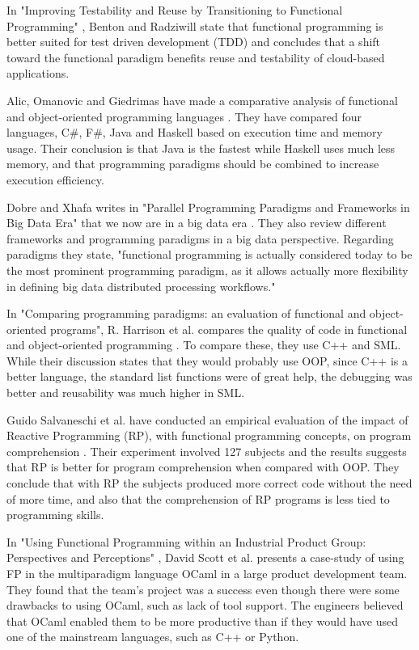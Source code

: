 \documentclass {article}
\begin{document}
In "Improving Testability and Reuse by Transitioning to Functional Programming" \cite{benrad}, Benton and Radziwill state that functional programming is better suited for test driven development (TDD) and concludes that a shift toward the functional paradigm benefits reuse and testability of cloud-based applications.

Alic, Omanovic and Giedrimas have made a comparative analysis of functional and object-oriented programming languages \cite{alomgi}. They have compared four languages, C\#, F\#, Java and Haskell based on execution time and memory usage. Their conclusion is that Java is the fastest while Haskell uses much less memory, and that programming paradigms should be combined to increase execution efficiency. 

Dobre and Xhafa writes in "Parallel Programming Paradigms and Frameworks in Big Data Era" that we now are in a big data era \cite{dobre}. They also review different frameworks and programming paradigms in a big data perspective. Regarding paradigms they state, "functional programming is actually considered today to be the most prominent programming paradigm, as it allows actually more flexibility in defining big data distributed processing workflows."

In "Comparing programming paradigms: an evaluation of functional and object-oriented programs", R. Harrison et al. compares the quality of code in functional and object-oriented programming \cite{hasmadole}. To compare these, they use C++ and SML. While their discussion states that they would probably use OOP, since C++ is a better language, the standard list functions were of great help, the debugging was better and reusability was much higher in SML.

Guido Salvaneschi et al. have conducted an empirical evaluation of the impact of Reactive Programming (RP), with functional programming concepts, on program comprehension \cite{saproamname}. Their experiment involved 127 subjects and the results suggests that RP is better for program comprehension when compared with OOP. They conclude that with RP the subjects produced more correct code without the need of more time, and also that the comprehension of RP programs is less tied to programming skills. 

In "Using Functional Programming within an Industrial Product Group: Perspectives and Perceptions" \cite{scomad}, David Scott et al. presents a case-study of using FP in the multiparadigm language OCaml in a large product development team. They found that the team's project was a success even though there were some drawbacks to using OCaml, such as lack of tool support. The engineers believed that OCaml enabled them to be more productive than if they would have used one of the mainstream languages, such as C++ or Python.
\end{document}
